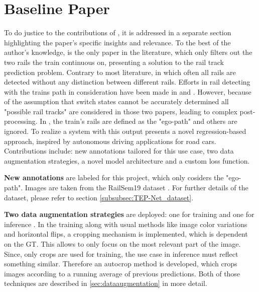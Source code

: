 \section{Baseline Paper}
\label{sec:baselinepaper}

To do justice to the contributions of \cite{tepNet2024}, it is addressed in a separate section highlighting the paper's specific insights and relevance. 
To the best of the author's knowledge, \cite{tepNet2024} is the only paper in the literature, which only filters out the two rails the train continuous on, presenting a solution to the rail track prediction problem.
Contrary to most literature, in which often all rails are detected without any distinction between different rails.
Efforts in rail detecting with the trains path in consideration have been made in \cite{RailraodSemanticPossibleTracks2020} and \cite{TPENet2023}.
However, because of the assumption that switch states cannot be accurately determined all "possible rail tracks" are considered in those two papers, leading to complex post-processing.
In \cite{tepNet2024}, the train's rails are defined as the "ego-path" and others are ignored.
To realize a system with this output \cite{tepNet2024} presents a novel regression-based approach, inspired by autonomous driving applications for road cars.
Contributions include: new annotations tailored for this use case, two data augmentation strategies, a novel model architecture and a custom loss function.

\vspace{1cm} %

\noindent \textbf{New annotations} are labeled for this project, which only cosiders the "ego-path".
Images are taken from the RailSem19 dataset \cite{tepNet2024}.
For further details of the dataset, please refer to section \ref{subsubsec:TEP-Net_dataset}.

\vspace{1cm} %

\noindent \textbf{Two data augmentation strategies} are deployed: one for training and one for inference \cite{tepNet2024}.
In the training along with usual methods like image color variations and horizontal flips, a cropping mechanism is implemented, which is dependent on the \ac{GT}.
This allows to only focus on the most relevant part of the image.
Since, only crops are used for training, the use case in inference must reflect something similar.
Therefore an autocrop method is developed, which crops images according to a running average of previous predictions.
Both of those techniques are described in \autoref{sec:dataaugmentation} in more detail.

